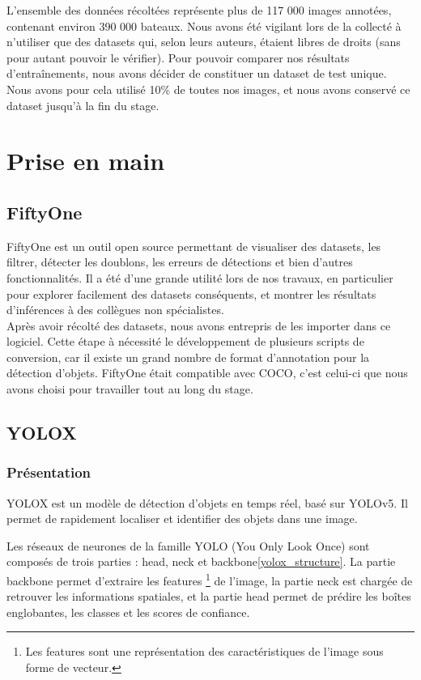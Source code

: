 L'ensemble des données récoltées représente plus de 117 000 images annotées, contenant environ 390 000 bateaux.
Nous avons été vigilant lors de la collecté à n'utiliser que des datasets qui, selon leurs auteurs,
étaient libres de droits (sans pour autant pouvoir le vérifier).
Pour pouvoir comparer nos résultats d'entraînements, nous avons décider de constituer un dataset
de test unique. Nous avons pour cela utilisé 10\% de toutes nos images, et nous avons conservé ce dataset
jusqu'à la fin du stage.

\section{Prise en main}

\subsection{FiftyOne}\label{fiftyone}

FiftyOne est un outil open source permettant de visualiser des datasets, les filtrer,
détecter les doublons, les erreurs de détections et bien d'autres fonctionnalités.
Il a été d'une grande utilité lors de nos travaux, en particulier pour explorer facilement
des datasets conséquents, et montrer les résultats d'inférences
à des collègues non spécialistes.\\

Après avoir récolté des datasets, nous avons entrepris de les importer dans ce logiciel. Cette étape à
nécessité le développement de plusieurs scripts de conversion, car il existe un grand nombre de format
d'annotation pour la détection d'objets. FiftyOne était compatible avec COCO, c'est celui-ci que nous
avons choisi pour travailler tout au long du stage.\\

\subsection{YOLOX}\label{yolox}

\subsubsection{Présentation}

YOLOX est un modèle de détection d'objets en temps réel, basé sur YOLOv5. Il permet de rapidement
localiser et identifier des objets dans une image.

Les réseaux de neurones de la famille YOLO (You Only Look Once) sont composés de trois parties
\cite{Redmon_Farhadi_2018} : head, neck et backbone\ref{yolox_structure}.
La partie backbone permet d'extraire les features \footnote{Les features sont une représentation des
caractéristiques de l'image sous forme de vecteur.} de l'image, la partie neck est chargée de retrouver les informations spatiales,
et la partie head permet de prédire les boîtes englobantes, les classes et les scores de confiance.\\

